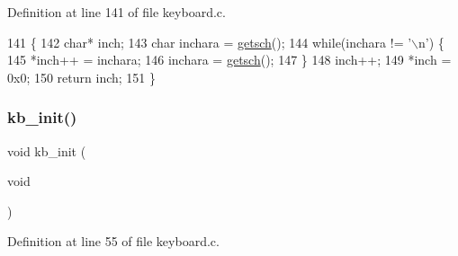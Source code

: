 Definition at line 141 of file keyboard.\+c.


\begin{DoxyCode}
141               \{
142     \textcolor{keywordtype}{char}* inch;
143     \textcolor{keywordtype}{char} inchara = \hyperlink{a00032_aa7ee03b27a489828ce588d0fc023cab3_aa7ee03b27a489828ce588d0fc023cab3}{getsch}();
144     \textcolor{keywordflow}{while}(inchara != \textcolor{charliteral}{'\(\backslash\)n'}) \{
145         *inch++ = inchara;
146         inchara = \hyperlink{a00032_aa7ee03b27a489828ce588d0fc023cab3_aa7ee03b27a489828ce588d0fc023cab3}{getsch}();
147     \}
148     inch++;
149     *inch = 0x0;
150     \textcolor{keywordflow}{return} inch;
151 \}
\end{DoxyCode}
\mbox{\label{a00035_aabdb223e5290f3b3c07bc82d075b87d7_aabdb223e5290f3b3c07bc82d075b87d7}} 
\subsubsection{\texorpdfstring{kb\+\_\+init()}{kb\_init()}}
{\footnotesize\ttfamily void kb\+\_\+init (\begin{DoxyParamCaption}\item[{void}]{ }\end{DoxyParamCaption})}



Definition at line 55 of file keyboard.\+c.


